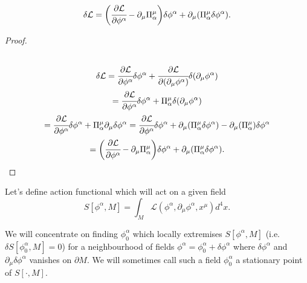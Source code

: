 \documentclass[main.tex]{subfiles}
\begin{document}
\begin{lemma}
\label{variation-lagrangian}
\begin{equation}
{\delta} \mathcal{L} = \bigg(\cfrac{\partial \mathcal{L}}{\partial \phi^\alpha} - \partial_\mu \Pi^\mu_\alpha \bigg){\delta}\phi^\alpha + \partial_\mu(\Pi^\mu_\alpha {\delta}\phi^\alpha).
\end{equation}
\end{lemma}
\begin{proof}
\begin{multline*}
\\
\delta \mathcal{L} = \cfrac{\partial \mathcal{L}}{\partial \phi^\alpha} \delta \phi^\alpha + \cfrac{\partial \mathcal{L}}{\partial(\partial_\mu \phi^\alpha)} \delta(\partial_\mu \phi^\alpha)\\
=\cfrac{\partial \mathcal{L}}{\partial \phi^\alpha} {\delta} \phi^\alpha + \Pi^\mu_\alpha {\delta} (\partial_\mu \phi^\alpha) \\
= \cfrac{\partial \mathcal{L}}{\partial \phi^\alpha} {\delta} \phi^\alpha + \Pi^\mu_\alpha \partial_\mu {\delta} \phi^\alpha = \cfrac{\partial \mathcal{L}}{\partial \phi^\alpha} {\delta} \phi^\alpha + \partial_\mu(\Pi^\mu_\alpha {\delta} \phi^\alpha) - \partial_\mu(\Pi^\mu_\alpha){\delta} \phi^\alpha \\
= \bigg(\cfrac{\partial \mathcal{L}}{\partial \phi^\alpha} - \partial_\mu \Pi^\mu_\alpha \bigg){\delta}\phi^\alpha + \partial_\mu(\Pi^\mu_\alpha {\delta}\phi^\alpha).
\\
\end{multline*}
\end{proof}

Let's define action functional which will act on a given field
\begin{equation}
S[\phi^\alpha, M] = \int_M \mathcal{L}(\phi^\alpha, \partial_\mu \phi^\alpha, x^\mu) d^4 x.
\end{equation}

We will concentrate on finding $\phi_0^\alpha$ which locally extremises $S[\phi^\alpha, M]$ (i.e. $\delta S[\phi_0^\alpha, M] = 0$) for a neighbourhood of fields 
$\phi^\alpha = \phi_0^\alpha + {\delta} \phi^\alpha$ where 
${\delta} \phi^\alpha$ and $\partial_\mu \delta \phi^\alpha$ vanishes on $\partial M$. 
We will sometimes call such a field $\phi_0^\alpha$ a stationary point of $S[\cdot, M]$.
\end{document}
